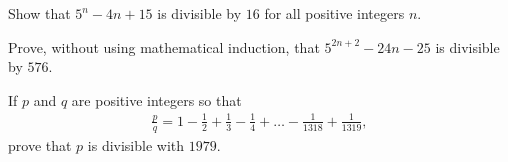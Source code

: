 \documentclass{subfile}
\begin{document}
%

	\begin{problem}
		Show that $5^{n} -4n+15$ is divisible by $16$ for all positive integers $n$.
	\end{problem}


	\begin{problem}
		Prove, without using mathematical induction, that  $5^{2n+2} -24 n -25$ is divisible by $576$.
	\end{problem}


	\begin{problem}
		If $p$ and $q$ are positive integers so that
			\begin{align*}
				\frac{p}{q}=1-\frac{1}{2}+\frac{1}{3}-\frac{1}{4}+ \dots -\frac{1}{1318}+\frac{1}{1319},
			\end{align*}
		prove that $p$ is divisible with $1979$. %
	\end{problem}
\end{document}
